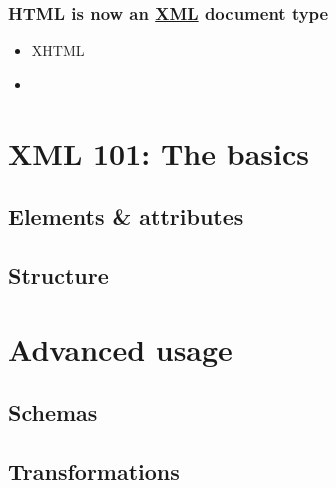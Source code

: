 

\frame
{
	\frametitle{HTML is now an \uline{XML} document type}
	
	\begin{itemize}
	
		\item XHTML
		
		\item 
	
	\end{itemize}

}




\section{XML 101: The basics}




\subsection*{Elements \& attributes}




\subsection*{Structure}




\section{Advanced usage}




\subsection*{Schemas}




\subsection*{Transformations}


